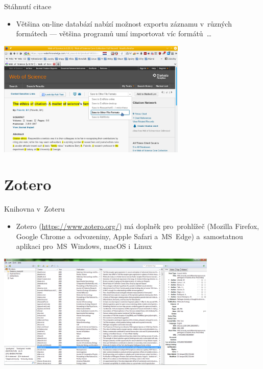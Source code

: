 \documentclass[compress, ucs, xelatex, 11pt, xcolor=svgnames, aspectratio=169,
	hyperref={
		bookmarks=true,
		unicode=true,
		colorlinks=true,
		pdftitle={Citacni software},
		plainpages=false,
		pdfauthor={Vojtech Zeisek},
		pdfsubject={Kratky uvod do citacniho software},
		pdfcreator={XeLaTeX},
		pdfkeywords={citace, reference, software, literatura},
		linkcolor=Crimson, %
		anchorcolor=Magenta, %
		citecolor=Magenta, %
		filecolor=Magenta, %
		menucolor=Magenta, %
		urlcolor=DarkTurquoise, %
		pdftex},
	url={hyphens, lowtilde} %
	]{beamer}
\begin{document}
\begin{frame}{Stáhnutí citace}
	\begin{itemize}
		\item Většina on-line databází nabízí možnost exportu záznamu v~různých formátech --- většina programů umí importovat víc formátů~\ldots
	\end{itemize}
	\begin{center}
		\includegraphics[height=5.5cm]{export_z_wos.png}
	\end{center}
\end{frame}

\section{Zotero}

\begin{frame}{Knihovna v~Zoteru}
	\begin{itemize}
		\item Zotero (\url{https://www.zotero.org/}) má doplněk pro~prohlížeč (Mozilla Firefox, Google Chrome a~odvozeniny, Apple Safari a~MS~Edge) a~samostatnou aplikaci pro~MS~Windows, macOS i~Linux
	\end{itemize}
	\begin{center}
		\includegraphics[height=5.5cm]{zotero.png}
	\end{center}
\end{frame}
\end{document}
